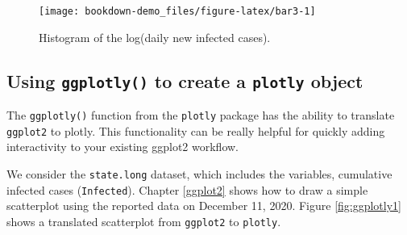 \documentclass[]{book}
\newenvironment{Shaded}{\begin{snugshade}}{\end{snugshade}}
\newcommand{\KeywordTok}[1]{\textcolor[rgb]{0.13,0.29,0.53}{\textbf{#1}}}
\newcommand{\DataTypeTok}[1]{\textcolor[rgb]{0.13,0.29,0.53}{#1}}
\newcommand{\DecValTok}[1]{\textcolor[rgb]{0.00,0.00,0.81}{#1}}
\newcommand{\StringTok}[1]{\textcolor[rgb]{0.31,0.60,0.02}{#1}}
\newcommand{\CommentTok}[1]{\textcolor[rgb]{0.56,0.35,0.01}{\textit{#1}}}
\newcommand{\OperatorTok}[1]{\textcolor[rgb]{0.81,0.36,0.00}{\textbf{#1}}}
\newcommand{\NormalTok}[1]{#1}
\begin{document}
\begin{Shaded}
\end{Shaded}

\begin{figure}

{\centering \texttt{[image: bookdown-demo\_files/figure-latex/bar3-1]} 

}

\caption{Histogram of the log(daily new infected cases).}\label{fig:bar3}
\end{figure}

\subsection{\texorpdfstring{Using \texttt{ggplotly()} to create a
\texttt{plotly}
object}{Using ggplotly() to create a plotly object}}\label{using-ggplotly-to-create-a-plotly-object}

The \texttt{ggplotly()} function from the \texttt{plotly} package has
the ability to translate \texttt{ggplot2} to plotly. This functionality
can be really helpful for quickly adding interactivity to your existing
ggplot2 workflow.

We consider the \texttt{state.long} dataset, which includes the
variables, cumulative infected cases (\texttt{Infected}). Chapter
\ref{ggplot2} shows how to draw a simple scatterplot using the reported
data on December 11, 2020. Figure \ref{fig:ggplotly1} shows a translated
scatterplot from \texttt{ggplot2} to \texttt{plotly}.
\end{document}
